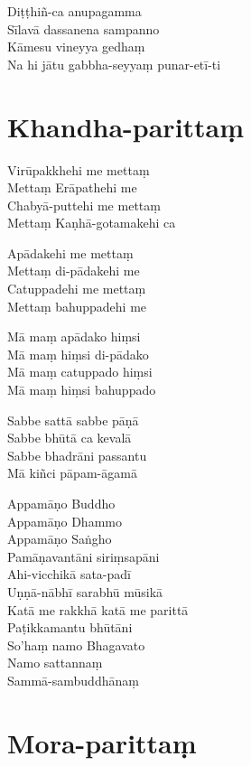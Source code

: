 Diṭṭhiñ-ca anupagamma\\
Sīlavā dassanena sampanno\\
Kāmesu vineyya gedhaṃ\\
Na hi jātu gabbha-seyyaṃ punar-etī-ti


\chapter{Khandha-parittaṃ}

Virūpakkhehi me mettaṃ\\
Mettaṃ Erāpathehi me\\
Chabyā-puttehi me mettaṃ\\
Mettaṃ Kaṇhā-gotamakehi ca

Apādakehi me mettaṃ\\
Mettaṃ di-pādakehi me\\
Catuppadehi me mettaṃ\\
Mettaṃ bahuppadehi me

Mā maṃ apādako hiṃsi\\
Mā maṃ hiṃsi di-pādako\\
Mā maṃ catuppado hiṃsi\\
Mā maṃ hiṃsi bahuppado

Sabbe sattā sabbe pāṇā\\
Sabbe bhūtā ca kevalā\\
Sabbe bhadrāni passantu\\
Mā kiñci pāpam-āgamā

Appamāṇo Buddho\\
Appamāṇo Dhammo\\
Appamāṇo Saṅgho\\
Pamāṇavantāni siriṃsapāni\\
Ahi-vicchikā sata-padī\\
Uṇṇā-nābhī sarabhū mūsikā\\
Katā me rakkhā katā me parittā\\
Paṭikkamantu bhūtāni\\
So'haṃ namo Bhagavato\\
Namo sattannaṃ\\
Sammā-sambuddhānaṃ


\chapter{Mora-parittaṃ}

